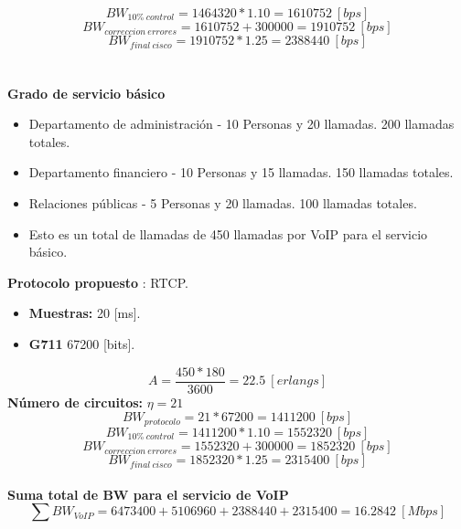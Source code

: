 \documentclass[12pt,letterpaper]{article}
\begin{document}
\begin{equation}
    BW_{10\% \ control}=1464320*1.10 = 1610752 \ [bps]
\end{equation}
\begin{equation}
    BW_{correccion \ errores}=1610752+300000 = 1910752 \ [bps]
\end{equation}
\begin{equation}
    BW_{final \ cisco}=1910752*1.25 = 2388440 \ [bps]
\end{equation}
\\ \\
\textbf{Grado de servicio básico}
\begin{itemize}
    \item Departamento de administración - 10 Personas y 20 llamadas. 200 llamadas totales.
    \item Departamento financiero - 10 Personas y 15 llamadas. 150 llamadas totales.
    \item Relaciones públicas - 5 Personas y 20 llamadas. 100 llamadas totales.
    \item Esto es un total de llamadas de 450 llamadas por VoIP para el servicio básico.
\end{itemize}
\textbf{Protocolo propuesto} : RTCP.
\begin{itemize}
    \item \textbf{Muestras: }20 [ms].
    \item \textbf{G711} 67200 [bits].
\end{itemize}
\begin{equation}
    A=\frac{450 * 180}{3600}=22.5 \ [erlangs]
\end{equation}
\textbf{Número de circuitos: } $\eta = 21$
\newline
\begin{equation}
    BW_{protocolo}=21 * 67200 = 1411200 \ [bps]
\end{equation}
\begin{equation}
    BW_{10\% \ control}=1411200*1.10 = 1552320 \ [bps]
\end{equation}
\begin{equation}
    BW_{correccion \ errores}=1552320+300000 = 1852320 \ [bps]
\end{equation}
\begin{equation}
    BW_{final \ cisco}=1852320*1.25 = 2315400 \ [bps]
\end{equation}
\\
\textbf{Suma total de BW para el servicio de VoIP}
\begin{equation}
    \sum BW_{VoIP}=6473400+5106960+2388440+2315400=16.2842 \ [Mbps]
\end{equation}
\end{document}
